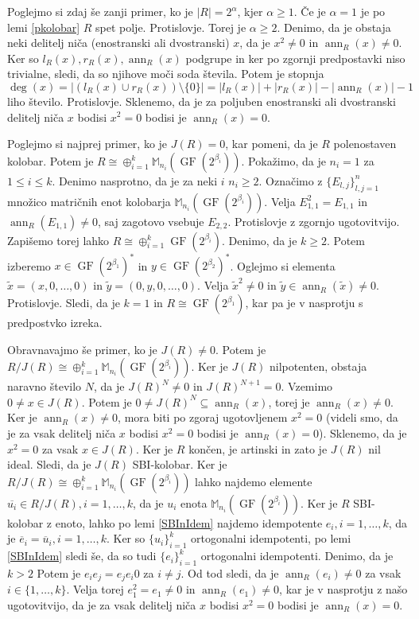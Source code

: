 \documentclass[a4paper, 12pt]{amsart}
\theoremstyle{definition} %
\theoremstyle{plain} %
\newcommand{\M}{\mathbb M}
\DeclareMathOperator{\ann}{ann}
\DeclareMathOperator{\GF}{GF}
\begin{document}
Poglejmo si zdaj še zanji primer, ko je $|R| = 2^\alpha$, kjer $\alpha\ge 1$. Če je $\alpha = 1$ je po lemi \ref{pkolobar} $R$ spet polje. Protislovje. Torej je $\alpha \ge 2$. Denimo, da je obstaja neki delitelj niča (enostranski ali dvostranski) $x$, da je $x^2 \neq 0$ in $\ann_R(x) \neq 0$. Ker so $l_R(x), r_R(x), \ann_R(x)$ podgrupe in ker po zgornji predpostavki niso trivialne, sledi, da so njihove moči soda števila. Potem je stopnja 
$$
\deg(x) = |(l_R(x) \cup r_R(x)) \setminus \{0\}| = |l_R(x) | + |r_R(x)| - |\ann_R(x)| - 1
$$
liho število. Protislovje. Sklenemo, da je za poljuben enostranski ali dvostranski delitelj niča $x$ bodisi $x^2 = 0$ bodisi je $\ann_R(x) = 0$. 

Poglejmo si najprej primer, ko je $J(R) = 0$, kar pomeni, da je $R$ polenostaven kolobar. Potem je $R\cong \oplus _{i=1}^k \M_{n_i}(\GF(2^{\beta_i}))$. Pokažimo, da je $n_i = 1$ za $1\le i \le k$. Denimo nasprotno, da je za neki $i$ $n_i\ge 2$. Označimo z $\{E_{l,j}\}_{l,j=1}^n$ množico matričnih enot kolobarja $\M_{n_i}(\GF(2^{\beta_i}))$. Velja $E_{1,1}^2 = E_{1,1}$ in $\ann_R(E_{1,1})\neq 0$, saj zagotovo vsebuje $E_{2,2}$. Protislovje z zgornjo ugotovitvijo. Zapišemo torej lahko $R\cong \oplus _{i=1}^k \GF(2^{\beta_i})$. Denimo, da je $k\ge 2$. Potem izberemo $x\in \GF(2^{\beta_1})^*$ in $y\in \GF(2^{\beta_2})^*$. Oglejmo si elementa $\tilde{x} = (x,0,\dots,0)$ in $\tilde{y} = (0,y,0,\dots,0)$. Velja $\tilde{x}^2 \neq 0$ in $\tilde{y}\in \ann_R(\tilde{x}) \neq 0$. Protislovje. Sledi, da je $k=1$ in $R\cong \GF(2^{\beta_1})$, kar pa je v nasprotju s predpostvko izreka.

Obravnavajmo še primer, ko je $J(R)\neq 0$. Potem je $R/J(R) \cong \oplus_{i=1}^k \M_{n_i}(\GF(2^{\beta_i}))$. Ker je $J(R)$ nilpotenten, obstaja naravno število $N$, da je $J(R)^N \neq 0$ in $J(R)^{N+1} = 0$. Vzemimo $0\neq x\in J(R)$. Potem je $0\neq J(R)^N \subseteq \ann_R(x)$, torej je $\ann_R(x) \neq 0$. Ker je $\ann_R(x) \neq 0$, mora biti po zgoraj ugotovljenem $x^2 = 0$ (videli smo, da je za vsak delitelj niča $x$ bodisi $x^2 = 0$ bodisi je $\ann_R(x) = 0$). Sklenemo, da je $x^2 = 0$ za vsak $x\in J(R)$. Ker je $R$ končen, je artinski in zato je $J(R)$ nil ideal. Sledi, da je $J(R)$ SBI-kolobar. Ker je $R/J(R)\cong \oplus_{i=1}^k \M_{n_i}(\GF(2^{\beta_i})) $ lahko najdemo elemente $\overline{u_i} \in R/J(R), i=1,\dots,k$, da je $u_i$ enota $\M_{n_i}(\GF(2^{\beta_i}))$. Ker je $R$ SBI-kolobar z enoto, lahko po lemi \ref{SBInIdem} najdemo idempotente $e_i, i=1,\dots,k$, da je $\overline{e}_i = \overline{u}_i, i=1,\dots,k$. Ker so $\{u_i\}_{i=1}^k$ ortogonalni idempotenti, po lemi \ref{SBInIdem} sledi še, da so tudi $\{e_i\}_{i=1}^k$ ortogonalni idempotenti.
Denimo, da je $k>2$
Potem je $e_i e_j = e_j e_i0$ za $i\neq j$. Od tod sledi, da je $\ann_R(e_i) \neq 0$ za vsak $i\in \{1, \dots,k\}$. Velja torej $e_1^2 = e_1 \neq 0$ in $\ann_R(e_1)\neq 0$, kar je v nasprotju z našo ugotovitvijo, da je za vsak delitelj niča $x$ bodisi $x^2 = 0$ bodisi je $\ann_R(x) = 0$.
\end{document}
